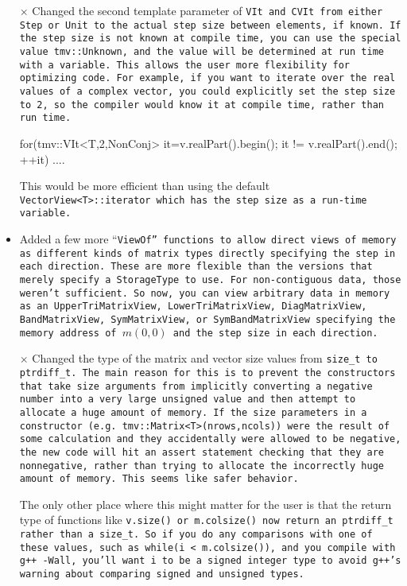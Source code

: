 \begin{itemize}
\item[$\times$]
Changed the second template parameter of \tt{VIt} and \tt{CVIt} from either \tt{Step} or \tt{Unit} to the actual step size between elements, if known.  If the step size is not known at compile time, you can use the special value \tt{tmv::Unknown}, and the value will be determined at run time with a variable.  This allows the user more flexibility for optimizing code.  For example, if you want to iterate over the real values of a complex vector, you could explicitly set the step size to 2, so the compiler would know it at compile time, rather than run time.
\begin{tmvcode}
for(tmv::VIt<T,2,NonConj> it=v.realPart().begin(); 
    it != v.realPart().end(); ++it) {
  ....
}
\end{tmvcode}
This would be more efficient than using the default \tt{VectorView<T>::iterator} which has the step size as a run-time variable.

\item 
Added a few more ``\tt{ViewOf}'' functions to allow direct views of memory as different kinds of matrix types directly specifying the step in each direction.  These are more flexible than the versions that merely specify a \tt{StorageType} to use.  For non-contiguous data, those weren't sufficient.  So now, you can view arbitrary data in memory as an \tt{UpperTriMatrixView}, \tt{LowerTriMatrixView},
\tt{DiagMatrixView}, \tt{BandMatrixView}, \tt{SymMatrixView}, or \tt{SymBandMatrixView} specifying the memory address of $m(0,0)$ and the step size in each direction.

\item[$\times$]
Changed the type of the matrix and vector size values from \tt{size\_t} to \tt{ptrdiff\_t}.  The main reason for this is to prevent the constructors that take size arguments from implicitly converting a negative number into a very large unsigned value and then attempt to allocate a huge amount of memory.  If the size parameters in a constructor (e.g. \tt{tmv::Matrix<T>(nrows,ncols)}) were the result of some calculation and they accidentally were allowed to be negative, the new code will hit an assert statement checking that they are nonnegative, rather than trying to allocate the incorrectly huge amount of memory.  This seems like safer behavior.

The only other place where this might matter for the user is that the return type of functions like \tt{v.size()} or \tt{m.colsize()} now return an \tt{ptrdiff\_t} rather than a \tt{size\_t}.  
So if you do any comparisons with one of these values, such as \tt{while(i < m.colsize())}, and you compile with \tt{g++ -Wall}, you'll want i to be a signed integer type to avoid \tt{g++}'s warning about comparing signed and unsigned types.


\end{itemize}
